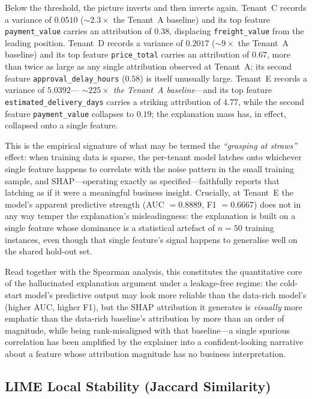 Below the threshold, the picture inverts and then inverts again. Tenant~C
records a variance of $0.0510$ ($\sim\!2.3\times$ the Tenant~A baseline) and
its top feature \texttt{payment\_value} carries an attribution of $0.38$,
displacing \texttt{freight\_value} from the leading position. Tenant~D
records a variance of $0.2017$ ($\sim\!9\times$ the Tenant~A baseline) and
its top feature \texttt{price\_total} carries an attribution of $0.67$,
more than twice as large as any single attribution observed at Tenant~A;
its second feature \texttt{approval\_delay\_hours} ($0.58$) is itself
unusually large. Tenant~E records a variance of $5.0392$---
\emph{$\sim\!225\times$ the Tenant~A baseline}---and its top feature
\texttt{estimated\_delivery\_days} carries a striking attribution of
$4.77$, while the second feature \texttt{payment\_value} collapses to
$0.19$; the explanation mass has, in effect, collapsed onto a single
feature.

This is the empirical signature of what may be termed the \emph{``grasping
at straws''} effect: when training data is sparse, the per-tenant model
latches onto whichever single feature happens to correlate with the noise
pattern in the small training sample, and SHAP---operating exactly as
specified---faithfully reports that latching as if it were a meaningful
business insight. Crucially, at Tenant~E the model's apparent predictive
strength (AUC $= 0.8889$, F1 $= 0.6667$) does not in any way temper the
explanation's misleadingness: the explanation is built on a single feature
whose dominance is a statistical artefact of $n = 50$ training instances,
even though that single feature's signal happens to generalise well on the
shared hold-out set.

Read together with the Spearman analysis, this constitutes the quantitative
core of the hallucinated explanation argument under a leakage-free regime:
the cold-start model's predictive output may look more reliable than the
data-rich model's (higher AUC, higher F1), but the SHAP attribution it
generates is \emph{visually} more emphatic than the data-rich baseline's
attribution by more than an order of magnitude, while being rank-misaligned
with that baseline---a single spurious correlation has been amplified by the
explainer into a confident-looking narrative about a feature whose
attribution magnitude has no business interpretation.

\subsection{LIME Local Stability (Jaccard Similarity)}
\label{subsec:lime-stability}

